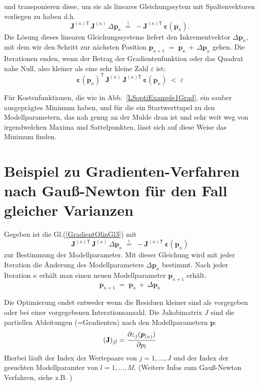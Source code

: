 und transponieren diese, um sie als lineares Gleichungssytem mit Spaltenvektoren vorliegen zu haben
d.h.
\begin{equation}
 \boldsymbol{J}^{(\kappa) \textsf{T}} \, \boldsymbol{J}^{(\kappa)} \, \Delta \mathbf{p}_\kappa
\; \overset{!}{=} \;
-  \boldsymbol{J}^{(\kappa) \textsf{T}} \, \boldsymbol{\varepsilon}(\mathbf{p}_\kappa) .
\label{GradientQlinGl3}
\end{equation}
Die Lösung dieses linearen Gleichungssystems liefert den Inkrementvektor $\Delta \mathbf{p}_\kappa$,
mit dem wir den Schritt zur nächsten Position $\mathbf{p}_{\kappa+1} \; = \; \mathbf{p}_{\kappa} \, + \,
\Delta \mathbf{p}_{\kappa}$ gehen. Die Iterationen enden, wenn der Betrag der Gradientenfunktion oder
das Quadrat nahe Null, also kleiner als eine sehr kleine Zahl $\varepsilon$ ist:
\begin{equation}
 \boldsymbol{\varepsilon}(\mathbf{p}_\kappa)^\mathsf{T}
\, \boldsymbol{J}^{(\kappa)} \, \boldsymbol{J}^{(\kappa) \textsf{T}} \, \boldsymbol{\varepsilon}(\mathbf{p}_\kappa) \;
< \; \varepsilon
\end{equation}

Für Kostenfunktionen, die wie in Abb.~\ref{LSoptiExample1Grad}, ein sauber ausgeprägtes Minimum
haben, und für die ein Startwerttupel zu den Modellparametern, das nah genug an der Mulde dran ist und
sehr weit weg von irgendwelchen Maxima und Sattelpunkten, lässt sich auf diese Weise das Minimum
finden.

\section{Beispiel zu Gradienten-Verfahren nach Gauß-Newton für den Fall gleicher Varianzen}

Gegeben ist die Gl.(\ref{GradientQlinGl3}) mit
\[
 \boldsymbol{J}^{(\kappa) \textsf{T}} \, \boldsymbol{J}^{(\kappa)} \, \Delta \mathbf{p}_\kappa
\; \overset{!}{=} \;
-  \boldsymbol{J}^{(\kappa) \textsf{T}} \, \boldsymbol{\varepsilon}(\mathbf{p}_\kappa)
\]
zur Bestimmung der Modellparameter. Mit dieser Gleichung wird mit jeder Iteration die Änderung des Modellparameters
$\Delta \mathbf{p}_\kappa$ bestimmt. Nach jeder Iteration $\kappa$  erhält man einen neuen Modellparameter  $\mathbf{p}_{\kappa +1}$ erhält.
\[
\mathbf{p}_{\kappa+1} \; = \; \mathbf{p}_{\kappa} \, + \,
\Delta \mathbf{p}_{\kappa}
\]

Die Optimierung endet entweder wenn die Residuen kleiner sind als vorgegeben oder
bei einer vorgegebenen Interationsanzahl.
Die Jakobimatrix $J$ sind die partiellen Ableitungen (=Gradienten) nach den
Modellparametern $\boldsymbol{p}$:
\[ (\mathbf{J})_{jl} = \frac{\displaystyle \partial \varepsilon_j (\boldsymbol p_{(\kappa)})}{\displaystyle \partial  p_l}\]
Hierbei läuft der Index der Wertepaare von $j=1,\ldots,J$  und der Index
der gesuchten Modellparamter von $l=1,\ldots,M$.
(Weitere Infos zum Gauß-Newton Verfahren, siehe z.B. \cite{Wiki02})

